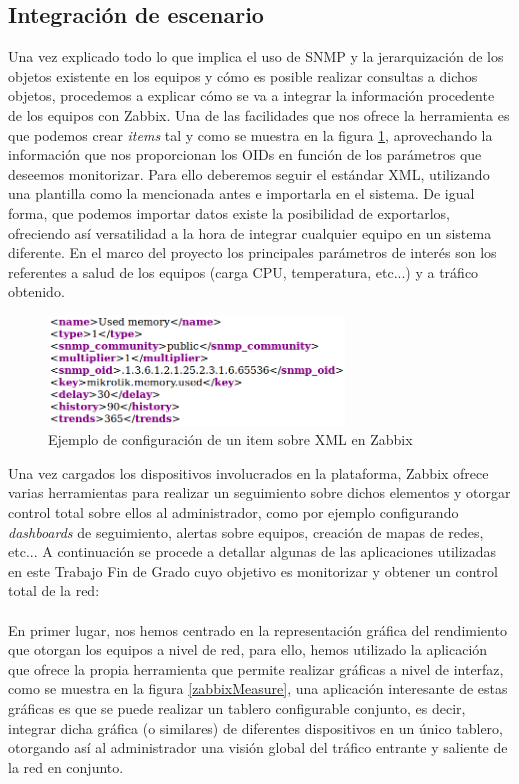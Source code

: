 \subsection{Integración de escenario}
Una vez explicado todo lo que implica el uso de SNMP y la jerarquización de los objetos existente en los equipos y cómo es posible realizar consultas a dichos objetos, procedemos a explicar cómo se va a integrar la información procedente de los equipos con Zabbix. Una de las facilidades que nos ofrece la herramienta es que podemos crear \textit{items} tal y como se muestra en la figura \ref{xmlTest}, aprovechando la información que nos proporcionan los OIDs en función de los parámetros que deseemos monitorizar. Para ello deberemos seguir el estándar XML, utilizando una plantilla como la mencionada antes e importarla en el sistema. De igual forma, que podemos importar datos existe la posibilidad de exportarlos, ofreciendo así versatilidad a la hora de integrar cualquier equipo en un sistema diferente. En el marco del proyecto los principales parámetros de interés son los referentes a salud de los equipos (carga CPU, temperatura, etc...) y a tráfico obtenido. 

\begin{figure}[H]
	\centering
	\includegraphics[width=0.7\textwidth]{img/xml_example.png}
	\caption{Ejemplo de configuración de un item sobre XML en Zabbix}
	\label{xmlTest}
\end{figure}

Una vez cargados los dispositivos involucrados en la plataforma, Zabbix ofrece varias herramientas para realizar un seguimiento sobre dichos elementos y otorgar control total sobre ellos al administrador, como por ejemplo configurando \textit{dashboards} de seguimiento, alertas sobre equipos, creación de mapas de redes, etc... A continuación se procede a detallar algunas de las aplicaciones utilizadas en este Trabajo Fin de Grado cuyo objetivo es monitorizar y obtener un control total de la red:\\\\

En primer lugar, nos hemos centrado en la representación gráfica del rendimiento que otorgan los equipos a nivel de red, para ello, hemos utilizado la aplicación que ofrece la propia herramienta que permite realizar gráficas a nivel de interfaz, como se muestra en la figura \ref{zabbixMeasure}, una aplicación interesante de estas gráficas es que se puede realizar un tablero configurable conjunto, es decir, integrar dicha gráfica (o similares) de diferentes dispositivos en un único tablero, otorgando así al administrador una visión global del tráfico entrante y saliente de la red en conjunto.

